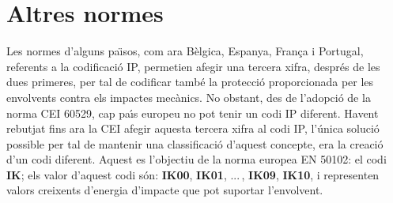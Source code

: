 \section{Altres normes}
Les normes d'alguns pa\"{\i}sos, com ara B\`{e}lgica, Espanya, Fran\c{c}a i
Portugal, referents a la codificaci\'{o} \textsf{IP}, permetien afegir
una tercera xifra, despr\'{e}s de les dues primeres,  per tal de
codificar tamb\'{e} la protecci\'{o} proporcionada per les envolvents contra
els impactes mec\`{a}nics. No obstant, des de l'adopci\'{o} de la norma
\textsf{CEI 60529}, cap pa\'{\i}s europeu no pot tenir
un codi \textsf{IP} diferent. Havent rebutjat fins ara la
\textsf{CEI} afegir aquesta tercera xifra al codi \textsf{IP},
l'\'{u}nica soluci\'{o} possible per tal de mantenir una classificaci\'{o}
d'aquest concepte, era la creaci\'{o} d'un codi diferent. Aquest es
l'objectiu de la norma europea \textsf{EN 50102}: el
codi \textbf{\textsf{IK}}; els valor d'aquest codi s\'{o}n:
\textbf{\textsf{IK00}}, \textbf{\textsf{IK01}}, ...\,,
\textbf{\textsf{IK09}}, \textbf{\textsf{IK10}}, i representen valors
creixents d'energia d'impacte que pot suportar l'envolvent.
